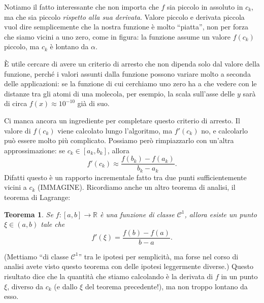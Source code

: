 \documentclass[a4paper]{report}
\newtheorem{theorem}{Teorema}[chapter]
\theoremstyle{definiton}
\theoremstyle{remark}
\newcommand{\x}{\mathbf{x}}
\begin{document}
Notiamo il fatto interessante che non importa che $f$ sia piccolo in assoluto in $c_k$, ma che sia piccolo \emph{rispetto alla sua derivata}. Valore piccolo e derivata piccola vuol dire semplicemente che la nostra funzione è molto ``piatta'', non per forza che siamo vicini a uno zero, come in figura: la funzione assume un valore $f(c_k)$ piccolo, ma $c_k$ è lontano da $\alpha$.
\begin{center}
\end{center}
È utile cercare di avere un criterio di arresto che non dipenda solo dal valore della funzione, perché i valori assunti dalla funzione possono variare molto a seconda delle applicazioni: se la funzione di cui cerchiamo uno zero ha a che vedere con le distanze tra gli atomi di una molecola, per esempio, la scala sull'asse delle $y$ sarà di circa $f(x) \approx 10^{-10}$ già di suo.

Ci manca ancora un ingrediente per completare questo criterio di arresto. Il valore di $f(c_k)$ viene calcolato lungo l'algoritmo, ma $f'(c_k)$ no, e calcolarlo può essere molto più complicato. Possiamo però rimpiazzarlo con un'altra approssimazione: se $c_k \in [a_k, b_k]$, allora
\[
f'(c_k) \approx \frac{f(b_k) - f(a_k)}{b_k - a_k}.
\]
Difatti questo è un rapporto incrementale fatto tra due punti sufficientemente vicini a $c_k$ (IMMAGINE). Ricordiamo anche un altro teorema di analisi, il teorema di Lagrange:
\begin{theorem}
    Se $f: [a,b] \to \mathbb{R}$ è una funzione di classe $\mathcal{C}^1$, allora esiste un punto $\xi \in (a,b)$ tale che
    \[
        f'(\xi) = \frac{f(b)-f(a)}{b-a}.
    \]
\end{theorem}
(Mettiamo ``di classe $\mathcal{C}^1$'' tra le ipotesi per semplicità, ma forse nel corso di analisi avete visto questo teorema con delle ipotesi leggermente diverse.) Questo risultato dice che la quantità che stiamo calcolando è la derivata di $f$ in un punto $\xi$, diverso da $c_k$ (e dallo $\xi$ del teorema precedente!), ma non troppo lontano da esso.
\end{document}
